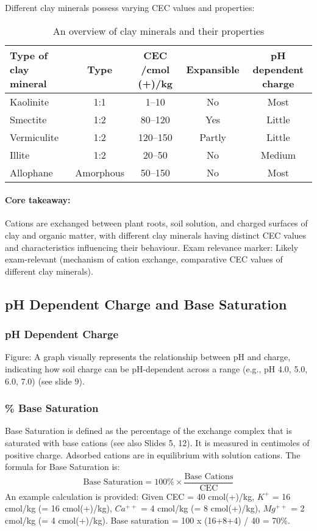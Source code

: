Different clay minerals possess varying CEC values and properties: 
\begin{table}[h]
    \centering
    \caption{An overview of clay minerals and their properties}
    \label{tab:clay_minerals}
    \begin{tabular}{ l | c | c | c | c }
        \textbf{Type of clay mineral} & \textbf{Type} & \textbf{CEC /cmol (+)/kg} & \textbf{Expansible} & \textbf{pH dependent charge} \\ 
        \hline
        Kaolinite   & 1:1       & 1--10    & No     & Most   \\ 
        Smectite    & 1:2       & 80--120  & Yes    & Little \\ 
        Vermiculite & 1:2       & 120--150 & Partly & Little \\ 
        Illite      & 1:2       & 20--50   & No     & Medium \\ 
        Allophane   & Amorphous & 50--150  & No     & Most   \\ 
    \end{tabular}
\end{table}

\paragraph*{Core takeaway:} 
Cations are exchanged between plant roots, soil solution, and charged surfaces of clay and organic matter, with different clay minerals having distinct CEC values and characteristics influencing their behaviour. Exam relevance marker: Likely exam-relevant (mechanism of cation exchange, comparative CEC values of different clay minerals).

\subsection{pH Dependent Charge and Base Saturation} \subsubsection*{pH Dependent Charge} 
Figure: A graph visually represents the relationship between pH and charge, indicating how soil charge can be pH-dependent across a range (e.g., pH 4.0, 5.0, 6.0, 7.0) (see slide 9).

\subsubsection*{\% Base Saturation} 
Base Saturation is defined as the percentage of the exchange complex that is saturated with base cations (see also Slides 5, 12). It is measured in centimoles of positive charge. Adsorbed cations are in equilibrium with solution cations. The formula for Base Saturation is: $$ \text{Base Saturation} = \text{100\%} \times \frac{\text{Base Cations}}{\text{CEC}} $$ An example calculation is provided: Given CEC = 40 cmol(+)/kg, $K^+$ = 16 cmol/kg (= 16 cmol(+)/kg), $Ca^{++}$ = 4 cmol/kg (= 8 cmol(+)/kg), $Mg^{++}$ = 2 cmol/kg (= 4 cmol(+)/kg). Base saturation = 100 x (16+8+4) / 40 = 70\%.

